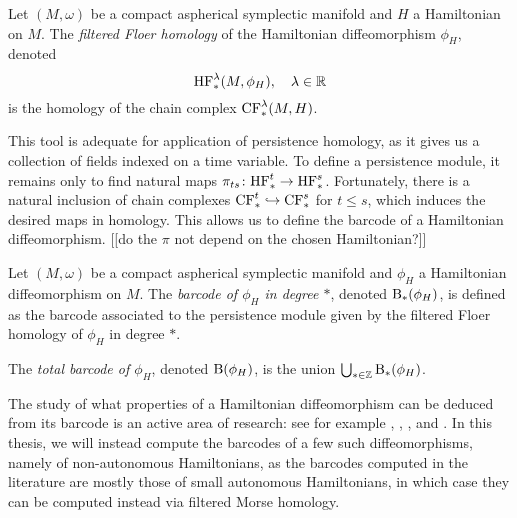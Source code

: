 \begin{definition}
Let $(M,\omega)$ be a compact aspherical symplectic manifold and $H$ a Hamiltonian on $M$. The \emph{filtered Floer homology} of the Hamiltonian diffeomorphism $\phi_H$, denoted
\begin{equation}
\mathrm{HF}^\lambda_*(M,\phi_H), \quad \lambda \in \mathbb{R}
\end{equation}
is the homology of the chain complex $\mathrm{CF}^\lambda_*(M,H)$.
\end{definition}

This tool is adequate for application of persistence homology, as it gives us a collection of fields indexed on a time variable. To define a persistence module, it remains only to find natural maps $\pi_{ts} \colon \mathrm{HF}^t_* \to \mathrm{HF}^s_*$. Fortunately, there is a natural inclusion of chain complexes $\mathrm{CF}^t_* \hookrightarrow \mathrm{CF}^s_*$ for $t \leq s$, which induces the desired maps in homology. This allows us to define the barcode of a Hamiltonian diffeomorphism. [[do the $\pi$ not depend on the chosen Hamiltonian?]]

\begin{definition}
Let $(M,\omega)$ be a compact aspherical symplectic manifold and $\phi_H$ a Hamiltonian diffeomorphism on $M$. The \emph{barcode of $\phi_H$ in degree $*$}, denoted $\mathrm{B}_*(\phi_H)$, is defined as the barcode associated to the persistence module given by the filtered Floer homology of $\phi_H$ in degree $*$.

The \emph{total barcode of $\phi_H$}, denoted $\mathrm{B}(\phi_H)$, is the union $\bigcup_{* \in \mathbb{Z}} \mathrm{B}_*(\phi_H)$.
\end{definition}

The study of what properties of a Hamiltonian diffeomorphism can be deduced from its barcode is an active area of research: see for example \cite{polterovich}, \cite{kislev2022bounds}, \cite{roux2018barcodes}, and \cite{polterovich2016autonomous}. In this thesis, we will instead compute the barcodes of a few such diffeomorphisms, namely of non-autonomous Hamiltonians, as the barcodes computed in the literature are mostly those of small autonomous Hamiltonians, in which case they can be computed instead via filtered Morse homology.
